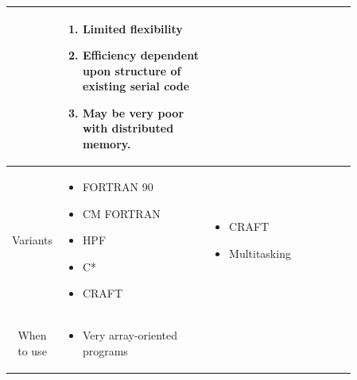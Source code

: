 \documentclass[12pt, a4paper]{book}
\begin{document}
\begin{longtable}{|c|p{0.43\linewidth}|p{0.43\linewidth}|}
\begin{enumerate}
                    \end{enumerate}                                                                & \begin{enumerate}
                                                                                                         \item Limited flexibility
                                                                                                         \item Efficiency dependent upon structure of existing serial code
                                                                                                         \item May be very poor with distributed memory.
                                                                                                     \end{enumerate}                                                        \\
    \hline
    Variants      & \begin{itemize}
                        \item FORTRAN 90
                        \item CM FORTRAN
                        \item HPF
                        \item   C*
                        \item CRAFT
                    \end{itemize}                                                                                 & \begin{itemize}
                                                                                                                        \item CRAFT
                                                                                                                        \item Multitasking
                                                                                                                    \end{itemize}                                                                                        \\
    \hline
    When to use   & \begin{itemize}
                        \item Very array-oriented programs
                              \begin{itemize}

\end{itemize}
\end{itemize}
\end{longtable}
\end{document}
